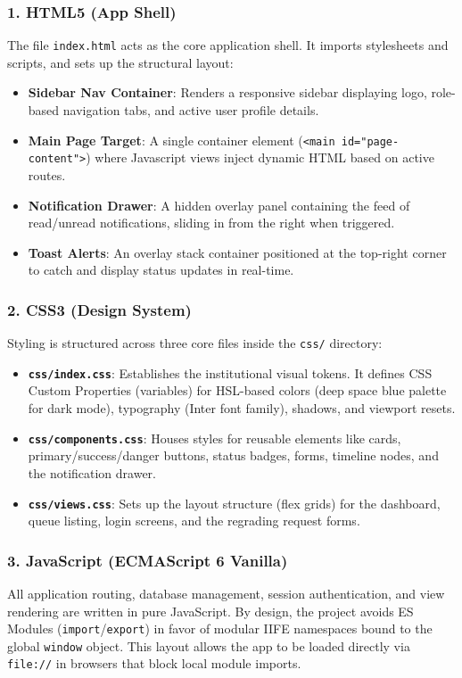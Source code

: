 \documentclass{article}
\begin{document}
\subsubsection{1. HTML5 (App Shell)}
The file \texttt{index.html} acts as the core application shell. It imports stylesheets and scripts, and sets up the structural layout:
\begin{itemize}
    \item \textbf{Sidebar Nav Container}: Renders a responsive sidebar displaying logo, role-based navigation tabs, and active user profile details.
    \item \textbf{Main Page Target}: A single container element (\texttt{<main id="page-content">}) where Javascript views inject dynamic HTML based on active routes.
    \item \textbf{Notification Drawer}: A hidden overlay panel containing the feed of read/unread notifications, sliding in from the right when triggered.
    \item \textbf{Toast Alerts}: An overlay stack container positioned at the top-right corner to catch and display status updates in real-time.
\end{itemize}

\subsubsection{2. CSS3 (Design System)}
Styling is structured across three core files inside the \texttt{css/} directory:
\begin{itemize}
    \item \textbf{\texttt{css/index.css}}: Establishes the institutional visual tokens. It defines CSS Custom Properties (variables) for HSL-based colors (deep space blue palette for dark mode), typography (Inter font family), shadows, and viewport resets.
    \item \textbf{\texttt{css/components.css}}: Houses styles for reusable elements like cards, primary/success/danger buttons, status badges, forms, timeline nodes, and the notification drawer.
    \item \textbf{\texttt{css/views.css}}: Sets up the layout structure (flex grids) for the dashboard, queue listing, login screens, and the regrading request forms.
\end{itemize}

\subsubsection{3. JavaScript (ECMAScript 6 Vanilla)}
All application routing, database management, session authentication, and view rendering are written in pure JavaScript. By design, the project avoids ES Modules (\texttt{import}/\texttt{export}) in favor of modular IIFE namespaces bound to the global \texttt{window} object. This layout allows the app to be loaded directly via \texttt{file://} in browsers that block local module imports.
\end{document}

